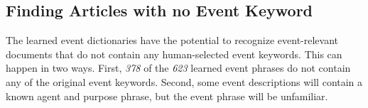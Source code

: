 \subsection{Finding Articles with no Event Keyword}

The learned event dictionaries have the potential to recognize
event-relevant documents that do not contain any human-selected event
keywords. This can happen in two ways. First, {\it 378} of the {\it
  623} learned event phrases do not contain any of the original event
keywords. Second, some event descriptions will contain
a known agent and purpose phrase, but the event
phrase will be unfamiliar.


